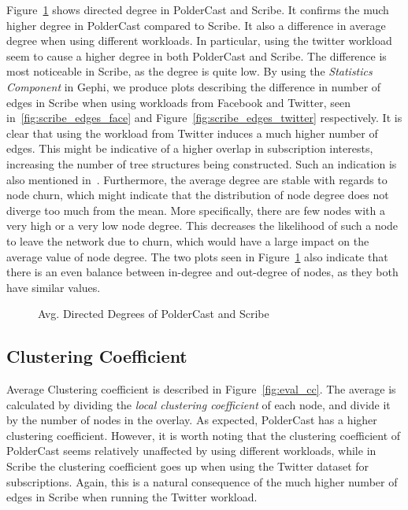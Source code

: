 Figure~\ref{fig:eval_directeddegree} shows directed degree in PolderCast
and Scribe. It confirms the much higher degree in PolderCast compared to
Scribe. It also a difference in average degree when using different
workloads. In particular, using the twitter workload seem to cause a
higher degree in both PolderCast and Scribe.  The difference is most
noticeable in Scribe, as the degree is quite low.  By using the
\emph{Statistics Component} in Gephi, we produce plots describing the
difference in number of edges in Scribe when using workloads from
Facebook and Twitter, seen in~\ref{fig:scribe_edges_face} and
Figure~\ref{fig:scribe_edges_twitter} respectively. It is clear that
using the workload from Twitter induces a much higher number of edges.
This might be indicative of a higher overlap in subscription interests,
increasing the number of tree structures being constructed. Such an
indication is also mentioned in~\cite{Setty:2012}. Furthermore, the
average degree are stable with regards to node churn, which might
indicate that the distribution of node degree does not diverge too much
from the mean. More specifically, there are few nodes with a very high
or a very low node degree. This decreases the likelihood of such a node
to leave the network due to churn, which would have a large impact on
the average value of node degree. The two plots seen in
Figure~\ref{fig:eval_directeddegree} also indicate that there is an even
balance between in-degree and out-degree of nodes, as they both have
similar values.

\begin{figure}[H]
    \centering
        
        \label{fig:eval_indegree}
        
        \label{fig:eval_outdegree}
    \caption{Avg. Directed Degrees of PolderCast and Scribe}
    \label{fig:eval_directeddegree}
\end{figure}


\subsection{Clustering Coefficient}

Average Clustering coefficient is described in Figure~\ref{fig:eval_cc}.
The average is calculated by dividing the \emph{local clustering
    coefficient} of each node, and divide it by the number of nodes in
the overlay. As expected, PolderCast has a higher clustering
coefficient. However, it is worth noting that the clustering coefficient
of PolderCast seems relatively unaffected by using different workloads,
while in Scribe the clustering coefficient goes up when using the
Twitter dataset for subscriptions. Again, this is a natural
consequence of the much higher number of edges in Scribe when running
the Twitter workload.

